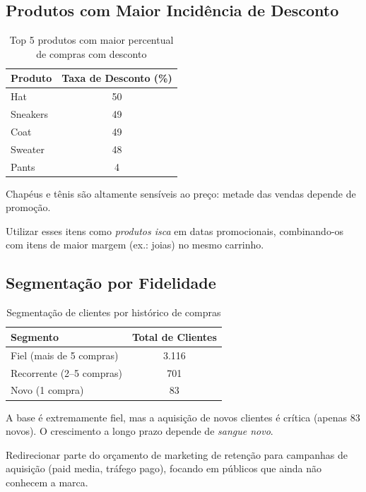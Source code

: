 \documentclass[12pt,a4paper]{article}
\begin{document}
\subsection{Produtos com Maior Incidência de Desconto}
\begin{table}[H]
\centering
\caption{Top 5 produtos com maior percentual de compras com desconto}
\label{tab:descontos}
\begin{tabular}{lc}
\toprule
\rowcolor{lightgray} \textbf{Produto} & \textbf{Taxa de Desconto (\%)} \\
\midrule
Hat       & 50 \\
Sneakers  & 49 \\
Coat      & 49 \\
Sweater   & 48 \\
Pants     & 4 \\
\bottomrule
\end{tabular}
\end{table}

\begin{insightbox}
Chapéus e tênis são altamente sensíveis ao preço: metade das vendas depende de promoção.
\end{insightbox}
\begin{actionbox}
Utilizar esses itens como \textit{produtos isca} em datas promocionais, combinando-os com itens de maior margem (ex.: joias) no mesmo carrinho.
\end{actionbox}

\subsection{Segmentação por Fidelidade}
\begin{table}[H]
\centering
\caption{Segmentação de clientes por histórico de compras}
\label{tab:segmentacao}
\begin{tabular}{lc}
\toprule
\rowcolor{lightgray} \textbf{Segmento} & \textbf{Total de Clientes} \\
\midrule
Fiel (mais de 5 compras) & 3.116 \\
Recorrente (2–5 compras) & 701   \\
Novo (1 compra)          & 83    \\
\bottomrule
\end{tabular}
\end{table}

\begin{insightbox}
A base é extremamente fiel, mas a aquisição de novos clientes é crítica (apenas 83 novos). O crescimento a longo prazo depende de \textit{sangue novo}.
\end{insightbox}
\begin{actionbox}
Redirecionar parte do orçamento de marketing de retenção para campanhas de aquisição (paid media, tráfego pago), focando em públicos que ainda não conhecem a marca.
\end{actionbox}
\end{document}
